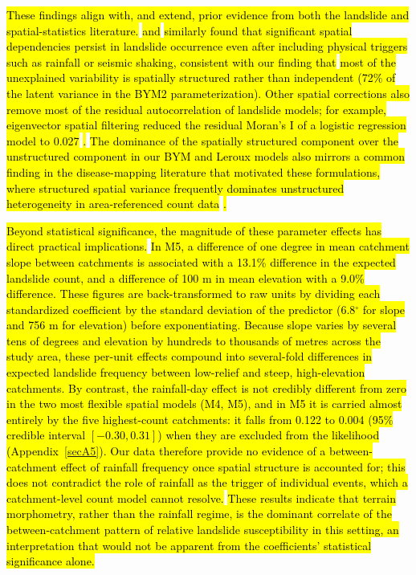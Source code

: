 \documentclass[journal abbreviation, manuscript]{copernicus}
\newcommand{\hlE}[1]{{\sethlcolor{edcyan}\hl{#1}}}
\begin{document}
\hl{These findings align with, and extend, prior evidence from both the landslide and spatial-statistics literature. }
\citet{lombardo2019geostatistical}\hl{ and }\citet{lombardo2020space}\hl{ similarly found that significant spatial dependencies persist in landslide occurrence even after including physical triggers such as rainfall or seismic shaking, consistent with our finding that} \hlE{most of the unexplained variability is spatially structured rather than independent (72\% of the latent variance in the BYM2 parameterization). Other spatial corrections also remove most of the residual autocorrelation of landslide models; for example, eigenvector spatial filtering reduced the residual Moran's I of a logistic regression model to 0.027 }\citep{li2019eigenvector}\hlE{.} \hl{The dominance of the spatially structured component over the unstructured component in our BYM and Leroux models also mirrors a common finding in the disease-mapping literature that motivated these formulations, where structured spatial variance frequently dominates unstructured heterogeneity in area-referenced count data }\citep{lawson2018bayesian, morris2019bayesian}\hl{.}

\hlE{Beyond statistical significance, the magnitude of these parameter effects has direct practical implications.} \hlE{In M5, a difference of one degree in mean catchment slope between catchments is associated with a 13.1\% difference in the expected landslide count, and a difference of 100 m in mean elevation with a 9.0\% difference. These figures are back-transformed to raw units by dividing each standardized coefficient by the standard deviation of the predictor (6.8$^{\circ}$ for slope and 756 m for elevation) before exponentiating. Because slope varies by several tens of degrees and elevation by hundreds to thousands of metres across the study area, these per-unit effects compound into several-fold differences in expected landslide frequency between low-relief and steep, high-elevation catchments. 
By contrast, the rainfall-day effect is not credibly different from zero in the two most flexible spatial models (M4, M5), and in M5 it is carried almost entirely by the five highest-count catchments: it falls from 0.122 to 0.004 (95\% credible interval $[-0.30, 0.31]$) when they are excluded from the likelihood (\mbox{Appendix~\ref{secA5}}). Our data therefore provide no evidence of a between-catchment effect of rainfall frequency once spatial structure is accounted for; this does not contradict the role of rainfall as the trigger of individual events, which a catchment-level count model cannot resolve.} 
\hlE{These results indicate that terrain morphometry, rather than the rainfall regime, is the dominant correlate of the between-catchment pattern of relative landslide susceptibility in this setting, an interpretation that would not be apparent from the coefficients' statistical significance alone.}
\end{document}
